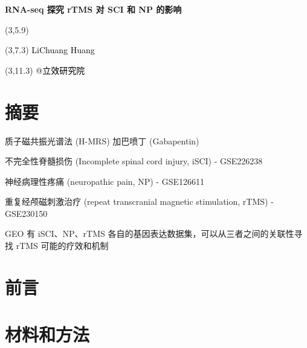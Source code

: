 \documentclass[
]{article}
\author{}
\date{\vspace{-2.5em}}
\begin{document}
\begin{titlepage} 
\begin{center} \textbf{\Huge RNA-seq 探究 rTMS 对
SCI 和 NP 的影响} \vspace{4em}
\begin{textblock}{10}(3,5.9) \huge
\textbf{\textcolor{white}{2023-12-11}}
\end{textblock} \begin{textblock}{10}(3,7.3)
\Large \textcolor{black}{LiChuang Huang}
\end{textblock} \begin{textblock}{10}(3,11.3)
\Large \textcolor{black}{@立效研究院}
\end{textblock} \end{center} \end{titlepage}
\restoregeometry


\tableofcontents

\listoffigures

\listoftables

\newpage


\hypertarget{abstract}{%
\section{摘要}\label{abstract}}

质子磁共振光谱法 (H-MRS)
加巴喷丁 (Gabapentin)

不完全性脊髓损伤 (Incomplete spinal cord injury, iSCI)
- GSE226238

神经病理性疼痛 (neuropathic pain, NP)
- GSE126611

重复经颅磁刺激治疗 (repeat transcranial magnetic stimulation, rTMS)
- GSE230150

GEO 有 iSCI、NP、rTMS 各自的基因表达数据集，可以从三者之间的关联性寻找 rTMS 可能的疗效和机制

\hypertarget{introduction}{%
\section{前言}\label{introduction}}

\hypertarget{methods}{%
\section{材料和方法}\label{methods}}
\end{document}
